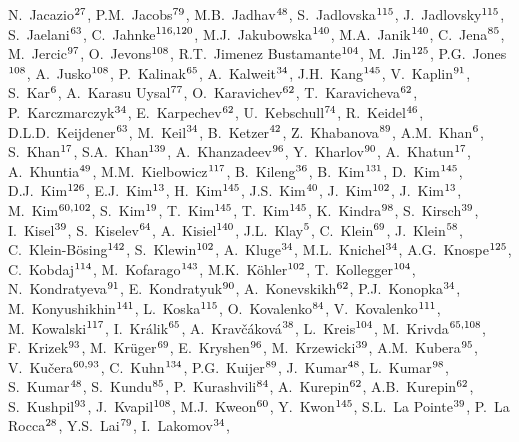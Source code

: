 \begin{flushleft}
N.~Jacazio$^{\rm 27}$, 
P.M.~Jacobs$^{\rm 79}$, 
M.B.~Jadhav$^{\rm 48}$, 
S.~Jadlovska$^{\rm 115}$, 
J.~Jadlovsky$^{\rm 115}$, 
S.~Jaelani$^{\rm 63}$, 
C.~Jahnke$^{\rm 116,120}$, 
M.J.~Jakubowska$^{\rm 140}$, 
M.A.~Janik$^{\rm 140}$, 
C.~Jena$^{\rm 85}$, 
M.~Jercic$^{\rm 97}$, 
O.~Jevons$^{\rm 108}$, 
R.T.~Jimenez Bustamante$^{\rm 104}$, 
M.~Jin$^{\rm 125}$, 
P.G.~Jones$^{\rm 108}$, 
A.~Jusko$^{\rm 108}$, 
P.~Kalinak$^{\rm 65}$, 
A.~Kalweit$^{\rm 34}$, 
J.H.~Kang$^{\rm 145}$, 
V.~Kaplin$^{\rm 91}$, 
S.~Kar$^{\rm 6}$, 
A.~Karasu Uysal$^{\rm 77}$, 
O.~Karavichev$^{\rm 62}$, 
T.~Karavicheva$^{\rm 62}$, 
P.~Karczmarczyk$^{\rm 34}$, 
E.~Karpechev$^{\rm 62}$, 
U.~Kebschull$^{\rm 74}$, 
R.~Keidel$^{\rm 46}$, 
D.L.D.~Keijdener$^{\rm 63}$, 
M.~Keil$^{\rm 34}$, 
B.~Ketzer$^{\rm 42}$, 
Z.~Khabanova$^{\rm 89}$, 
A.M.~Khan$^{\rm 6}$, 
S.~Khan$^{\rm 17}$, 
S.A.~Khan$^{\rm 139}$, 
A.~Khanzadeev$^{\rm 96}$, 
Y.~Kharlov$^{\rm 90}$, 
A.~Khatun$^{\rm 17}$, 
A.~Khuntia$^{\rm 49}$, 
M.M.~Kielbowicz$^{\rm 117}$, 
B.~Kileng$^{\rm 36}$, 
B.~Kim$^{\rm 131}$, 
D.~Kim$^{\rm 145}$, 
D.J.~Kim$^{\rm 126}$, 
E.J.~Kim$^{\rm 13}$, 
H.~Kim$^{\rm 145}$, 
J.S.~Kim$^{\rm 40}$, 
J.~Kim$^{\rm 102}$, 
J.~Kim$^{\rm 13}$, 
M.~Kim$^{\rm 60,102}$, 
S.~Kim$^{\rm 19}$, 
T.~Kim$^{\rm 145}$, 
T.~Kim$^{\rm 145}$, 
K.~Kindra$^{\rm 98}$, 
S.~Kirsch$^{\rm 39}$, 
I.~Kisel$^{\rm 39}$, 
S.~Kiselev$^{\rm 64}$, 
A.~Kisiel$^{\rm 140}$, 
J.L.~Klay$^{\rm 5}$, 
C.~Klein$^{\rm 69}$, 
J.~Klein$^{\rm 58}$, 
C.~Klein-B\"{o}sing$^{\rm 142}$, 
S.~Klewin$^{\rm 102}$, 
A.~Kluge$^{\rm 34}$, 
M.L.~Knichel$^{\rm 34}$, 
A.G.~Knospe$^{\rm 125}$, 
C.~Kobdaj$^{\rm 114}$, 
M.~Kofarago$^{\rm 143}$, 
M.K.~K\"{o}hler$^{\rm 102}$, 
T.~Kollegger$^{\rm 104}$, 
N.~Kondratyeva$^{\rm 91}$, 
E.~Kondratyuk$^{\rm 90}$, 
A.~Konevskikh$^{\rm 62}$, 
P.J.~Konopka$^{\rm 34}$, 
M.~Konyushikhin$^{\rm 141}$, 
L.~Koska$^{\rm 115}$, 
O.~Kovalenko$^{\rm 84}$, 
V.~Kovalenko$^{\rm 111}$, 
M.~Kowalski$^{\rm 117}$, 
I.~Kr\'{a}lik$^{\rm 65}$, 
A.~Krav\v{c}\'{a}kov\'{a}$^{\rm 38}$, 
L.~Kreis$^{\rm 104}$, 
M.~Krivda$^{\rm 65,108}$, 
F.~Krizek$^{\rm 93}$, 
M.~Kr\"uger$^{\rm 69}$, 
E.~Kryshen$^{\rm 96}$, 
M.~Krzewicki$^{\rm 39}$, 
A.M.~Kubera$^{\rm 95}$, 
V.~Ku\v{c}era$^{\rm 60,93}$, 
C.~Kuhn$^{\rm 134}$, 
P.G.~Kuijer$^{\rm 89}$, 
J.~Kumar$^{\rm 48}$, 
L.~Kumar$^{\rm 98}$, 
S.~Kumar$^{\rm 48}$, 
S.~Kundu$^{\rm 85}$, 
P.~Kurashvili$^{\rm 84}$, 
A.~Kurepin$^{\rm 62}$, 
A.B.~Kurepin$^{\rm 62}$, 
S.~Kushpil$^{\rm 93}$, 
J.~Kvapil$^{\rm 108}$, 
M.J.~Kweon$^{\rm 60}$, 
Y.~Kwon$^{\rm 145}$, 
S.L.~La Pointe$^{\rm 39}$, 
P.~La Rocca$^{\rm 28}$, 
Y.S.~Lai$^{\rm 79}$, 
I.~Lakomov$^{\rm 34}$, 

\end{flushleft}
